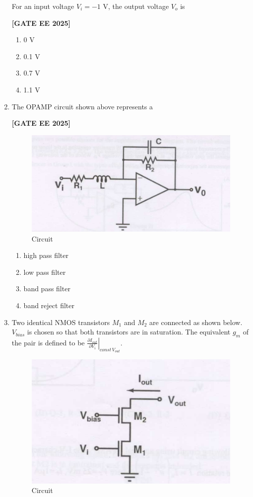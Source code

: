\documentclass[12pt]{article}
\begin{document}
\begin{enumerate}[leftmargin=*, label=\textbf{Q.\arabic*:}]
For an input voltage $V_i = -1$ V, the output voltage $V_o$ is
 
\noindent \textbf{[GATE EE 2025]}
\begin{enumerate}
  \item 0 V
  \item 0.1 V
  \item 0.7 V
  \item 1.1 V
\end{enumerate}

\item The OPAMP circuit shown above represents a
 
\noindent \textbf{[GATE EE 2025]}
\begin{figure}[H]\centering
\includegraphics[width=0.5\columnwidth]{figs/q47.png}
\caption{Circuit}
\label{fig:q47}
\end{figure}

\begin{enumerate}
  \item high pass filter
  \item low pass filter
  \item band pass filter
  \item band reject filter
\end{enumerate}

\item Two identical NMOS transistors $M_1$ and $M_2$ are connected as shown below. $V_{bias}$ is chosen so that both transistors are in saturation. The equivalent $g_m$ of the pair is defined to be $\left. \frac{\partial I_{out}}{\partial V_i} \right|_{const\, V_{out}}$.

\begin{figure}[H]\centering
\includegraphics[width=0.5\columnwidth]{figs/q48.png}
\caption{Circuit}
\label{fig:q48}
\end{figure}


\end{enumerate}
\end{document}
